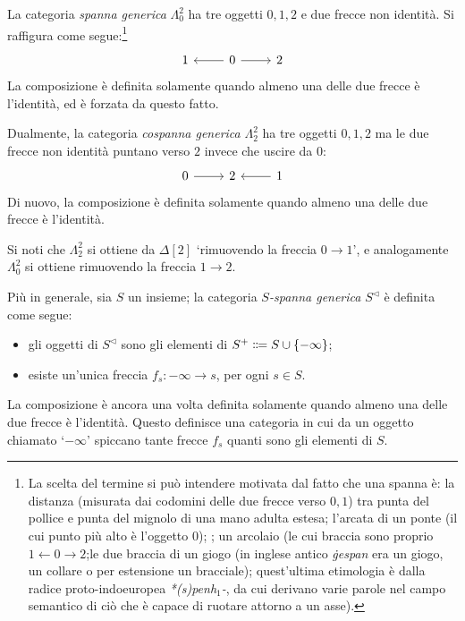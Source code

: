 \begin{example}\label{ex_spancospan}
 La categoria \emph{spanna generica}
 \(\Lambda^2_0\) ha tre oggetti \(0,1,2\) e due frecce non identità. Si raffigura come segue:\footnote{La scelta del termine si può intendere motivata dal fatto che una spanna è: la distanza (misurata dai codomini delle due frecce verso \(0,1\)) tra punta del pollice e punta del mignolo di una mano adulta estesa; l'arcata di un ponte (il cui punto più alto è l'oggetto \(0\)); ; un arcolaio (le cui braccia sono proprio \(1\leftarrow 0\to 2\);le due braccia di un giogo (in inglese antico \emph{ġespan} era un giogo, un collare o per estensione un bracciale); quest'ultima etimologia è dalla radice proto-indoeuropea \emph{*(s)penh\(_1\)-}, da cui derivano varie parole nel campo semantico di ciò che è capace di ruotare attorno a un asse).}
 \[\begin{tikzcd}
   1 & 0 \ar[r]\ar[l] & 2
  \end{tikzcd}\]
 La composizione è definita solamente quando almeno una delle due frecce è l'identità, ed è forzata da questo fatto.

 Dualmente, la categoria \emph{cospanna generica} \(\Lambda^2_2\) ha tre oggetti \(0,1,2\) ma le due frecce non identità puntano verso \(2\) invece che uscire da \(0\):
 \[\begin{tikzcd}
   0\ar[r] & 2 & 1\ar[l]
  \end{tikzcd}\]
 Di nuovo, la composizione è definita solamente quando almeno una delle due frecce è l'identità.

 Si noti che \(\Lambda^2_2\) si ottiene da \(\Delta[2]\) `rimuovendo la freccia \(0\to 1\)', e analogamente \(\Lambda^2_0\) si ottiene rimuovendo la freccia \(1\to 2\).

 Più in generale, sia \(S\) un insieme; la categoria \emph{\(S\)-spanna generica} \(S^\lhd\) è definita come segue:
 \begin{itemize}
  \item gli oggetti di \(S^\lhd\) sono gli elementi di \(S^+ \defeq  S\cup \{-\infty\}\);
  \item esiste un'unica freccia \(f_s \colon -\infty\to s\), per ogni \(s\in S\).
 \end{itemize}
 La composizione è ancora una volta definita solamente quando almeno una delle due frecce è l'identità. Questo definisce una categoria in cui da un oggetto chiamato `\(-\infty\)' spiccano tante frecce \(f_s\) quanti sono gli elementi di \(S\).


\end{example}

